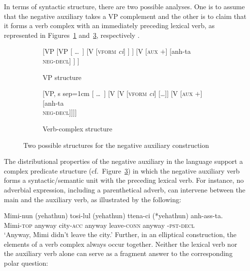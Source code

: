\documentclass[output=paper
 	        ,biblatex
                ,babelshorthands
                ,newtxmath
                ,draftmode
                ,colorlinks, citecolor=brown
]{langscibook}
\begin{document}
\begin{exe}
\begin{xlist}
\begin{exe}
\begin{xlist}
In terms of syntactic structure, there
are two possible analyses.  One is to assume that the negative auxiliary takes a VP complement and the other is to claim that it forms a verb complex with
an immediately preceding lexical verb, as represented in Figures~\ref{negation-fig:3a} and~\ref{negation-fig:3b}, respectively
\citep{Chung98a-u, Kim:16}.
%
\begin{figure}
	\begin{subfigure}[b]{0.48\textwidth}
\centering
		\begin{forest}
			[VP
				[VP
					[ \dots\ ]
					[V {[\textsc{vform} \textit{ci}]}
					]
					]
				[V {[\textsc{aux $+$}]}
					[anh-ta\\ \textsc{neg-decl}]
				]
			]	
		\end{forest}
	\caption{VP structure}\label{negation-fig:3a}
		\end{subfigure}	
\hfill
	\begin{subfigure}[b]{0.48\textwidth}
\centering
		\begin{forest}
			[VP, s sep=1cm
				[ \dots\ ]
				[V
					[V {[\textsc{vform} \textit{ci}]}
						[\dots]]
					[V {[\textsc{aux $+$}]}
						[anh-ta\\ \textsc{neg-decl}]]]]
		\end{forest}
	\caption{Verb-complex structure}\label{negation-fig:3b}	
		\end{subfigure}
	\caption{Two possible structures for the negative auxiliary construction}
\end{figure}

The distributional properties of the negative auxiliary in the language support
 a complex predicate structure (cf.\ Figure~\ref{negation-fig:3b}) in which the negative auxiliary verb
forms a syntactic/semantic unit with the preceding lexical verb.
For instance, no adverbial expression, including
a parenthetical adverb, can intervene between
the main and the auxiliary verb, as illustrated by the
following:

\ea
\gll Mimi-nun          (yehathun)           tosi-lul          (yehathun)           ttena-ci            (*yehathun) anh-ass-ta. \\
     Mimi-\textsc{top} \hphantom{(}anyway city-\textsc{acc} \hphantom{(}anyway leave-\textsc{conn} \hphantom{(*}anyway \NEG-\textsc{pst}-\textsc{decl} \\
\glt `Anyway, Mimi didn't leave the city.'
\z
%
Further, in an elliptical construction, the elements of a verb complex
 always occur together. Neither the lexical  verb nor the auxiliary verb alone can serve
as a fragment answer to the corresponding polar question:


\end{xlist}
\end{exe}
\end{xlist}
\end{exe}
\end{document}
